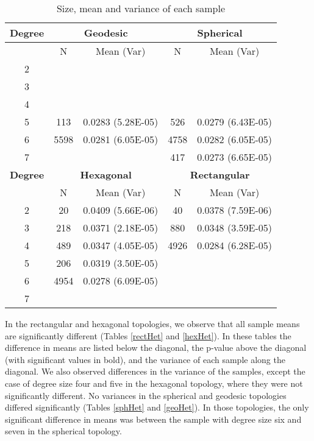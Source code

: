 \begin{table}[htb]
\centering
\caption{Size, mean and variance of each sample}
\label{meanvar1}
\begin{tabular}{|c||cc|cc|}
\hline
\textbf{Degree} & \multicolumn{2}{c|}{\textbf{Geodesic}} &
\multicolumn{2}{c|}{\textbf{Spherical}} 
 \\
\hline
& N & Mean (Var) & N & Mean (Var)  \\
\hline
2&&&&\\ 
3&&&&\\ 
4&&&&\\ 
5& 113& 0.0283 (5.28E-05)& 526& 0.0279 (6.43E-05)\\ 
6& 5598& 0.0281 (6.05E-05)& 4758& 0.0282 (6.05E-05)\\ 
7&&& 417& 0.0273 (6.65E-05)\\ 
\hline
\textbf{Degree} & \multicolumn{2}{c|}{\textbf{Hexagonal}} &
\multicolumn{2}{c|}{\textbf{Rectangular}} \\
\hline
& N & Mean (Var) & N & Mean (Var)  \\
\hline
2& 20& 0.0409 (5.66E-06)& 40& 0.0378 (7.59E-06)\\ 
3& 218& 0.0371 (2.18E-05)& 880& 0.0348 (3.59E-05)\\ 
4& 489& 0.0347 (4.05E-05)& 4926& 0.0284 (6.28E-05)\\ 
5&  206& 0.0319 (3.50E-05)&&\\ 
6&  4954& 0.0278 (6.09E-05)&&\\ 
7&&&&\\ 
\hline
\end{tabular} \end{table}

In the rectangular and hexagonal topologies, we observe that all sample means
are significantly different (Tables \ref{rectHet} and \ref{hexHet}). In these
tables 
 the difference in means are listed below the diagonal, the p-value above the
diagonal (with significant values in bold), and the variance of each
sample along the diagonal. We also observed differences in the variance of
the samples, except the case of degree size four and five in the hexagonal
topology, where they were not significantly different. No variances in the
spherical and geodesic topologies differed significantly (Tables \ref{sphHet}
and \ref{geoHet}).  In those topologies,
the only significant difference in means was between the sample with degree size
six and seven in the spherical topology.

